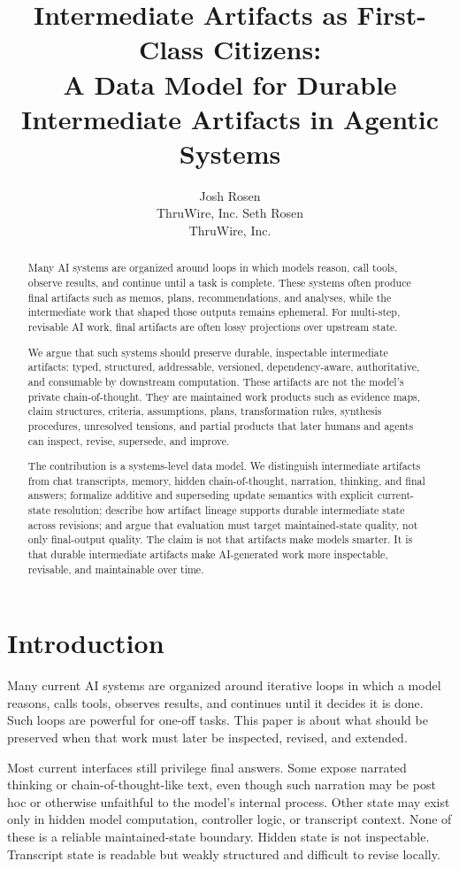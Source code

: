 \documentclass{article}
\title{Intermediate Artifacts as First-Class Citizens:\\
A Data Model for Durable Intermediate Artifacts in Agentic Systems}
\author{
  Josh Rosen \\
  ThruWire, Inc.
  \And
  Seth Rosen \\
  ThruWire, Inc.
}
\begin{document}
\maketitle

\begin{abstract}
Many AI systems are organized around loops in which models reason, call tools, observe results, and continue until a task is complete. These systems often produce final artifacts such as memos, plans, recommendations, and analyses, while the intermediate work that shaped those outputs remains ephemeral. For multi-step, revisable AI work, final artifacts are often lossy projections over upstream state.

We argue that such systems should preserve durable, inspectable intermediate artifacts: typed, structured, addressable, versioned, dependency-aware, authoritative, and consumable by downstream computation. These artifacts are not the model's private chain-of-thought. They are maintained work products such as evidence maps, claim structures, criteria, assumptions, plans, transformation rules, synthesis procedures, unresolved tensions, and partial products that later humans and agents can inspect, revise, supersede, and improve.

The contribution is a systems-level data model. We distinguish intermediate artifacts from chat transcripts, memory, hidden chain-of-thought, narration, thinking, and final answers; formalize additive and superseding update semantics with explicit current-state resolution; describe how artifact lineage supports durable intermediate state across revisions; and argue that evaluation must target maintained-state quality, not only final-output quality. The claim is not that artifacts make models smarter. It is that durable intermediate artifacts make AI-generated work more inspectable, revisable, and maintainable over time.
\end{abstract}

\section{Introduction}

Many current AI systems are organized around iterative loops in which a model reasons, calls tools, observes results, and continues until it decides it is done. Such loops are powerful for one-off tasks. This paper is about what should be preserved when that work must later be inspected, revised, and extended.

Most current interfaces still privilege final answers. Some expose narrated thinking or chain-of-thought-like text, even though such narration may be post hoc or otherwise unfaithful to the model's internal process. Other state may exist only in hidden model computation, controller logic, or transcript context. None of these is a reliable maintained-state boundary. Hidden state is not inspectable. Transcript state is readable but weakly structured and difficult to revise locally.
\end{document}
